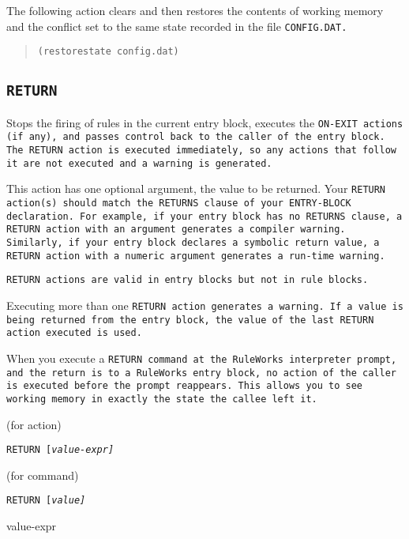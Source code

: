 {{\Example

The following action clears and then restores the contents of working
memory and the conflict set to the same state recorded in the file
\tt{CONFIG.DAT}.

\begin{quote}
\begin{verbatim}
(restorestate config.dat)
\end{verbatim}
\end{quote}

\subsection{\tt{RETURN}}

Stops the firing of rules in the current entry block, executes the
\tt{ON-EXIT} actions (if any), and passes control back to the caller
of the entry block. The \tt{RETURN} action is executed immediately, so
any actions that follow it are not executed and a warning is
generated.

This action has one optional argument, the value to be returned. Your
\tt{RETURN} action(s) should match the \tt{RETURNS} clause of your
\tt{ENTRY-BLOCK} declaration. For example, if your entry block has no
\tt{RETURNS} clause, a \tt{RETURN} action with an argument generates a
compiler warning. Similarly, if your entry block declares a symbolic
return value, a \tt{RETURN} action with a numeric argument generates a
run-time warning.

\tt{RETURN} actions are valid in entry blocks but not in rule blocks.

Executing more than one \tt{RETURN} action generates a warning. If
a value is being returned from the entry block, the value of
the last \tt{RETURN} action executed is used.

When you execute a \tt{RETURN} command at the RuleWorks interpreter
prompt, and the return is to a RuleWorks entry block, no action of the
caller is executed before the prompt reappears. This allows you to see
working memory in exactly the state the callee left it.

\Format (for action)

\tt{RETURN} [\it{value-expr}]

(for command)

\tt{RETURN} [\it{value}]

\begin{arguments}

\item[value-expr]


\end{arguments}}}
